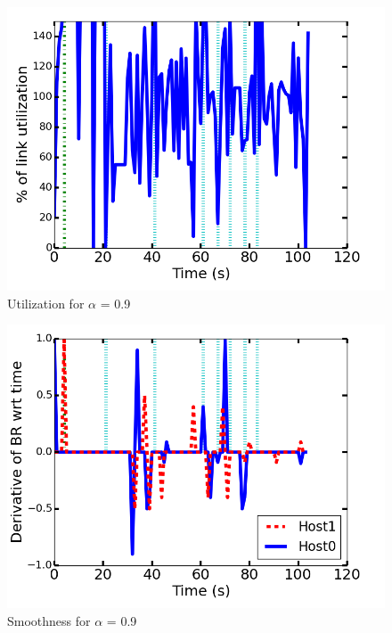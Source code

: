 \documentclass[12pt]{article}
\begin{document}
\begin{figure}
\centering
\includegraphics[scale = 0.75]{exp3/utilization.png}
\caption{Utilization for $\alpha$ = 0.9}
\end{figure}

\begin{figure}
\centering
\includegraphics[scale = 0.75]{exp3/smoothness.png}
\caption{Smoothness for $\alpha$ = 0.9}
\end{figure}
\end{document}
